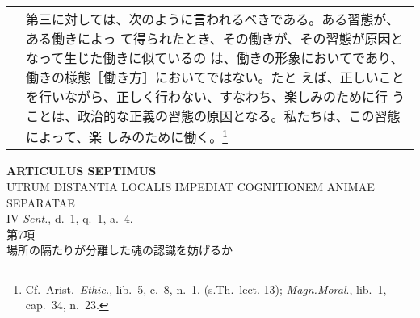 \documentclass[10pt]{jsarticle} %
\begin{document}
\begin{longtable}{p{21em}p{21em}}
&

第三に対しては、次のように言われるべきである。ある習態が、ある働きによっ
て得られたとき、その働きが、その習態が原因となって生じた働きに似ているの
は、働きの形象においてであり、働きの様態［働き方］においてではない。たと
えば、正しいことを行いながら、正しく行わない、すなわち、楽しみのために行
うことは、政治的な正義の習態の原因となる。私たちは、この習態によって、楽
しみのために働く。\footnote{Cf.~Arist.~{\it Ethic.}, lib.~5, c.~8,
n.~1. (s.Th.~lect. 13); {\it Magn.Moral}., lib.~1, cap.~34, n.~23.}


\end{longtable}

\newpage
{}

\begin{center}
 {\Large {\bf ARTICULUS SEPTIMUS}}\\
 {\large UTRUM DISTANTIA LOCALIS IMPEDIAT COGNITIONEM ANIMAE SEPARATAE}\\
 {\footnotesize IV {\it Sent.}, d.~1, q.~1, a.~4.}\\
 {\Large 第7項\\場所の隔たりが分離した魂の認識を妨げるか}
\end{center}
\end{document}
